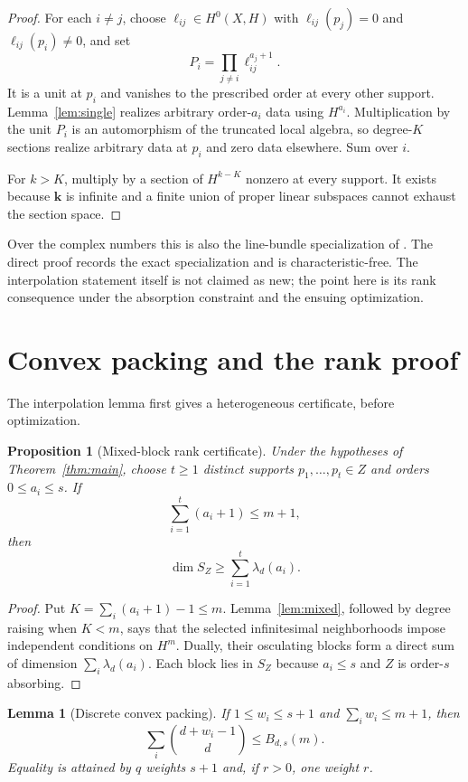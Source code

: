 \documentclass[11pt]{article}
\newtheorem{proposition}[theorem]{Proposition}
\newtheorem{lemma}[theorem]{Lemma}
\theoremstyle{definition}
\theoremstyle{remark}
\theoremstyle{plain}
\newcommand{\kk}{\mathbf k}
\begin{document}
\begin{proof}
For each $i\ne j$, choose
$\ell_{ij}\in H^0(X,H)$ with
$\ell_{ij}(p_j)=0$ and $\ell_{ij}(p_i)\ne0$, and set
\[
 P_i=\prod_{j\ne i}\ell_{ij}^{a_j+1}.
\]
It is a unit at $p_i$ and vanishes to the prescribed order at every other
support.  Lemma~\ref{lem:single} realizes arbitrary order-$a_i$ data using
$H^{a_i}$.  Multiplication by the unit $P_i$ is an automorphism of the
truncated local algebra, so degree-$K$ sections realize arbitrary data at
$p_i$ and zero data elsewhere.  Sum over $i$.

For $k>K$, multiply by a section of $H^{k-K}$ nonzero at every support.
It exists because $\kk$ is infinite and a finite union of proper linear
subspaces cannot exhaust the section space.
\end{proof}

Over the complex numbers this is also the line-bundle specialization of
\cite[Proposition~2.3]{BDRS1999}.  The direct proof records the exact
specialization and is characteristic-free.  The interpolation statement itself
is not claimed as new; the point here is its rank consequence under the
absorption constraint and the ensuing optimization.

\section{Convex packing and the rank proof}

The interpolation lemma first gives a heterogeneous certificate, before
optimization.

\begin{proposition}[Mixed-block rank certificate]\label{prop:certificate}
Under the hypotheses of Theorem~\ref{thm:main}, choose $t\geq1$ distinct supports
$p_1,\ldots,p_t\in Z$ and orders $0\leq a_i\leq s$.  If
\[
 \sum_{i=1}^t(a_i+1)\leq m+1,
\]
then
\[
 \dim S_Z\geq\sum_{i=1}^t\lambda_d(a_i).
\]
\end{proposition}

\begin{proof}
Put $K=\sum_i(a_i+1)-1\leq m$.  Lemma~\ref{lem:mixed}, followed by degree
raising when $K<m$, says that the selected infinitesimal neighborhoods impose
independent conditions on $H^m$.  Dually, their osculating blocks form a direct
sum of dimension $\sum_i\lambda_d(a_i)$.  Each block lies in $S_Z$ because
$a_i\leq s$ and $Z$ is order-$s$ absorbing.
\end{proof}

\begin{lemma}[Discrete convex packing]\label{lem:packing}
If $1\leq w_i\leq s+1$ and $\sum_iw_i\leq m+1$, then
\[
 \sum_i\binom{d+w_i-1}{d}\leq B_{d,s}(m).
\]
Equality is attained by $q$ weights $s+1$ and, if $r>0$, one weight $r$.
\end{lemma}
\end{document}
